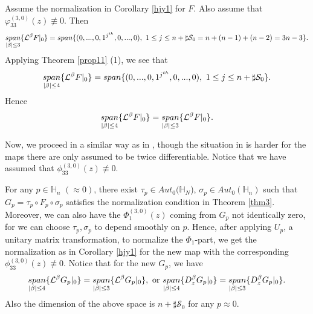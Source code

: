 \documentclass[12pt]{article}
\numberwithin{equation}{section}
\def\a{\alpha}
\def\HH{{\mathbb H}}
\def\a{\alpha}
\def\a{\alpha}
\def\a{\alpha}
\def\a{\alpha}
\begin{document}
Assume the normalization in Corollary \ref{hjy1} for $F$. Also
assume that $\varphi_{33}^{(3,0)}(z)\not \equiv 0$. Then
\begin{equation}
\underset{|\beta|\le 3}{span}\{ {\cal L}^\beta F|_0\}= {span}\{ (0,
...,0, 1^{j^{th}},  0, ...,0),\ 1\leq j \leq n+\sharp
\mathcal{S}_0=n+(n-1)+(n-2)=3n-3\}.
\end{equation}
Applying Theorem \ref{prop11} (1), we see that
\begin{equation}
\underset{|\beta|\le 4}{span}\{ {\cal L}^\beta F|_0\}= {span}\{ (0,
...,0, 1^{j^{th}},  0, ...,0),\ 1\leq j \leq n+\sharp
\mathcal{S}_0\}.
\end{equation}
Hence
\begin{equation}
\underset{|\beta|\le 4}{span}\{ {\cal L}^\beta F|_0\}=
\underset{|\beta|\le 3}{span}\{ {\cal L}^\beta F|_0\}.
\end{equation}




Now, we  proceed  in  a similar  way as in \cite{Hu1}, though the
situation in \cite{Hu1} is harder for the maps there are only
assumed to be twice differentiable. Notice that we have assumed that
 $\phi^{(3,0)}_{33}(z)\not \equiv 0$.

For any $p\in \HH_n$ $(\approx 0)$, there exist $\tau_p\in
Aut_0({\HH_N} $), $\sigma_p \in Aut_0(\HH_n)$ such that $G_p=\tau_p
\circ F_p \circ \sigma_p$ satisfies the normalization condition  in
Theorem \ref{thm3}.  Moreover, we can also have the
$\Phi^{(3,0)}_1(z)$ coming from $G_p$ not identically zero,
for we can choose $\tau_p,\sigma_p$ to depend smoothly on $p$.
Hence, after applying $U_p$, a unitary matrix transformation, to
normalize the $\Phi_1$-part, we get the normalization as in
Corollary \ref{hjy1} for the new map  with the corresponding
$\phi^{(3,0)}_{33}(z)\not \equiv 0$.
 Notice that for the new $G_p$, we have
\begin{equation}\begin{split} \label{0011}
\underset{|\beta|\le 4}{span}\{ {\cal L}^\beta G_p|_0\}=
\underset{|\beta|\le 3}{span}\{ {\cal L}^\beta G_p|_0\}, \
\hbox{or}\ \underset{|\beta|\le 4}{span}\{ {D}_z^\beta G_p|_0\}=
\underset{|\beta|\le 3}{span}\{ {D}_z^\beta G_p|_0\}.
\end{split}\end{equation} Also the dimension of the above space is $n+\sharp
\mathcal{S}_0$ for any $p\approx 0$.
\end{document}
